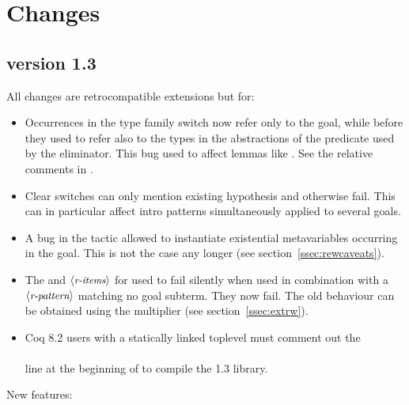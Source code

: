 \section{Changes}

\subsection{\ssr{} version 1.3}
All changes are retrocompatible extensions but for:
\begin{itemize}
\item Occurrences in the type family switch now refer only to the goal, while
      before they used to refer also to the types in the abstractions of the 
      predicate used by the eliminator. This bug used to affect lemmas like 
      . See the relative comments in .
\item Clear switches can only mention existing hypothesis and
      otherwise fail. This can in particular affect intro patterns
      simultaneously applied to several goals.
\item A bug in the  tactic allowed to
      instantiate existential metavariables occurring in the goal.
      This is not the case any longer (see section~\ref{ssec:rewcaveats}).
\item The  and  $\langle\mbox{\itshape\rmfamily\small r-items}\rangle$ for  used to 
      fail silently when used in combination with a $\langle\mbox{\itshape\rmfamily\small r-pattern}\rangle$ matching no
      goal subterm. They now fail. The old behaviour can be obtained using
      the  multiplier (see section~\ref{ssec:extrw}).
\item Coq 8.2 users with a statically linked toplevel must comment out the\\
      \\
      line at the beginning of  to compile the 1.3 library.
\end{itemize}
New features:
